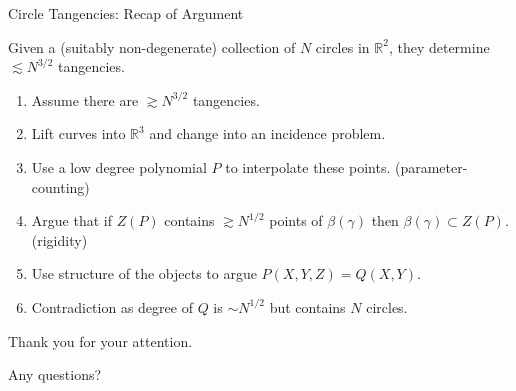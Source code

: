 \documentclass{beamer}
\newcommand{\RR}{\mathbb R}
\newcommand{\nfr}[1]{\begin{frame} #1
\end{frame}}
\begin{document}
\nfr{{Circle Tangencies: Recap of Argument}
\begin{theorem}
    Given a (suitably non-degenerate) collection of $N$ circles in $\RR^2$, they determine $\lesssim N^{3/2}$ tangencies.
\end{theorem}
\begin{enumerate}
    \item Assume there are $\gtrsim N^{3/2}$ tangencies.
    \item Lift curves into $\RR^3$ and change into an incidence problem.
    \item Use a low degree polynomial $P$ to interpolate these points. (parameter-counting)
    \item Argue that if $Z(P)$ contains $\gtrsim N^{1/2}$ points of $\beta(\gamma)$ then $\beta(\gamma) \subset Z(P)$. (rigidity)
    \item Use structure of the objects to argue $P(X,Y,Z) = Q(X,Y)$.
    \item Contradiction as degree of $Q$ is $\sim N^{1/2}$ but contains $N$ circles.
\end{enumerate}
}
\nfr{{}
\begin{center}
    

Thank you for your attention.

    Any questions? 

\end{center}
}



\end{document}

